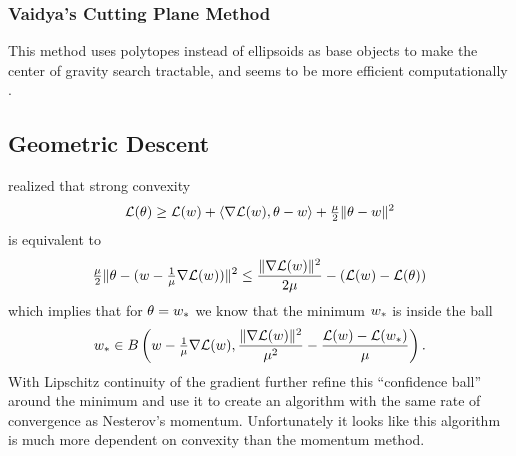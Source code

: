 \subsubsection{Vaidya's Cutting Plane Method}

This method uses polytopes instead of ellipsoids as base objects to make the
center of gravity search tractable, and seems to be more efficient
computationally \parencite[e.g.][Section
2.3]{bubeckConvexOptimizationAlgorithms2015}.

\subsection{Geometric Descent}

\textcite{bubeckGeometricAlternativeNesterov2015} realized that strong convexity
\begin{align*}
	\mathcal{L}(\theta)
	\ge \mathcal{L}(w) + \langle \nabla\mathcal{L}(w), \theta-w\rangle
	+ \tfrac{\mu}{2}\|\theta-w\|^2
\end{align*}
is equivalent to
\begin{align*}
	\tfrac{\mu}{2}\|\theta - (w - \tfrac1{\mu} \nabla\mathcal{L}(w))\|^2
	\le \frac{\|\nabla\mathcal{L}(w)\|^2}{2\mu} - (\mathcal{L}(w)-\mathcal{L}(\theta))
\end{align*}
which implies that for \(\theta=w_*\) we know that the minimum
\(w_*\) is inside the ball
\begin{align*}
	w_*\in B\left(w- \tfrac1{\mu}\nabla\mathcal{L}(w), 
		\frac{\|\nabla\mathcal{L}(w)\|^2}{\mu^2}
		- \frac{ \mathcal{L}(w)-\mathcal{L}(w_*) }{\mu}
	\right).
\end{align*}
With Lipschitz continuity of the gradient \textcite{bubeckGeometricAlternativeNesterov2015}
further refine this ``confidence ball'' around the minimum and use it to create
an algorithm with the same rate of convergence as Nesterov's momentum.
Unfortunately it looks like this algorithm is much more dependent on
convexity than the momentum method.


\endinput
